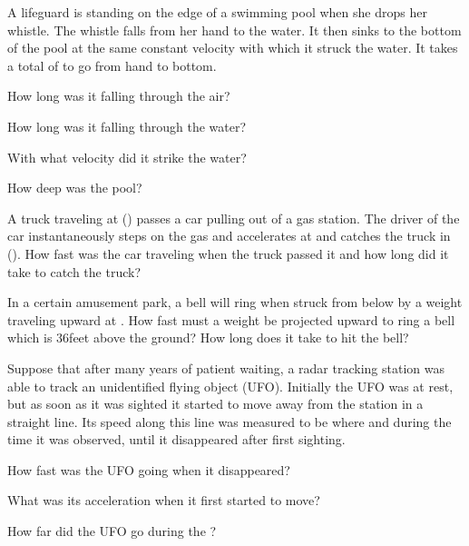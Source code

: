 {\begin{two-digit-list}
\item [8.] A lifeguard is standing on the edge of a swimming pool when she drops
her whistle.
The whistle falls  from her hand to the water.
It then sinks to the bottom of the pool at the same constant velocity with
which it struck the water.
It takes a total of  to go from hand to bottom.
\begin{one-digit-list}
\item [a.] How long was it falling through the air?
\item [b.] How long was it falling through the water?
\item [c.] With what velocity did it strike the water?
\item [d.] How deep was the pool?
\end{one-digit-list}

\item [9.] A truck traveling at  () passes a car pulling out
of a gas station.
The driver of the car instantaneously steps on the gas and accelerates at
 and catches the truck in  ().
How fast was the car traveling when the truck passed it and how long did it
take to catch the truck?

\item [10.] In a certain amusement park, a bell will ring when struck from
below by a weight traveling upward at .
How fast must a weight be projected upward to ring a bell which is 36\unit{feet}
above the ground?
How long does it take to hit the bell?

\item [11.] Suppose that after many years of patient waiting, a radar tracking
station was able to track an unidentified flying object (UFO).
Initially the UFO was at rest, but as soon as it was sighted it started to
move away from the station in a straight line.
Its speed along this line was measured to be 
where  and  during the time it
was observed, until it disappeared  after first sighting.
\begin{one-digit-list}
\item [a.] How fast was the UFO going when it disappeared?
\item [b.] What was its acceleration when it first started to move?
\item [c.] How far did the UFO go during the ?
\end{one-digit-list}


\end{two-digit-list}}

